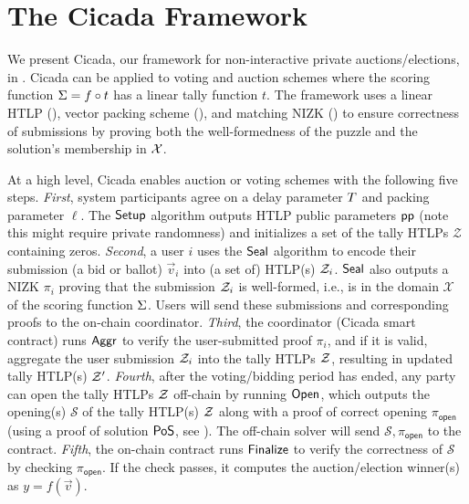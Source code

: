 \section{The Cicada Framework}\label{sec:cicada_framework}

We present Cicada, our framework for non-interactive private auctions/elections, in . Cicada can be applied to voting and auction schemes where the scoring function $\Sigma = f \circ t$ has a linear tally function $t$. The framework uses a linear HTLP (), vector packing scheme (), and matching NIZK () to ensure correctness of submissions by proving both the well-formedness of the puzzle and the solution's membership in $\mathcal{X}$.

At a high level, Cicada enables auction or voting schemes with the following five steps. 
\emph{First}, system participants agree on a delay parameter $T$ and packing parameter $\ell$. The $\mathsf{Setup}$ algorithm outputs HTLP public parameters $\mathsf{pp}$ (note this might require private randomness) and initializes a set of the tally HTLPs $\mathcal{Z}$ containing zeros. 
\emph{Second}, a user $i$ uses the $\mathsf{Seal}$ algorithm to encode their submission (a bid or ballot) $\vec{v}_i$ into (a set of) HTLP(s) $\mathcal{Z}_i$. $\mathsf{Seal}$ also outputs a NIZK $\pi_i$ proving that the submission $\mathcal{Z}_i$ is well-formed, i.e., is in the domain $\mathcal{X}$ of the scoring function $\Sigma$. Users will send these submissions and corresponding proofs to the on-chain coordinator. 
\emph{Third}, the coordinator (Cicada smart contract) runs $\mathsf{Aggr}$ to verify the user-submitted proof $\pi_i$, and if it is valid, aggregate the user submission $\mathcal{Z}_i$ into the tally HTLPs $\mathcal{Z}$, resulting in updated tally HTLP(s) $\mathcal{Z}'$. 
\emph{Fourth}, after the voting/bidding period has ended, any party can open the tally HTLPs $\mathcal{Z}$ off-chain by running $\mathsf{Open}$, which outputs the opening(s) $\mathcal{S}$ of the tally HTLP(s) $\mathcal{Z}$ along with a proof of correct opening $\pi_{\textsf{open}}$ (using a proof of solution ${\sf PoS}$, see ). The off-chain solver will send $\mathcal{S}, \pi_{\mathsf{open}}$ to the contract. 
\emph{Fifth}, the on-chain contract runs $\mathsf{Finalize}$ to verify the correctness of $\mathcal{S}$ by checking $\pi_{\mathsf{open}}$. If the check passes, it computes the auction/election winner(s) as $y=f(\vec{v})$.


